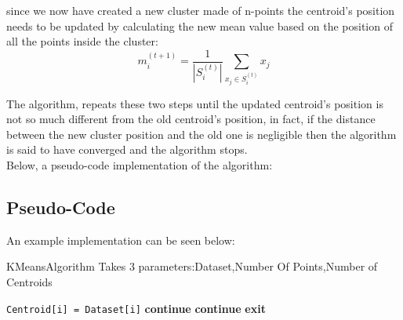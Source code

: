 \documentclass[10pt,twocolumn,letterpaper]{article}
\begin{document}
since we now have created a new cluster made of n-points the centroid's position needs to be updated by calculating the new 
mean value based on the position of all the points inside the cluster:\newline
\begin{equation}
\label{eq:first}
m^{(t+1)}_i = \frac{1}{\left|S^{(t)}_i\right|} \sum_{x_j \in S^{(t)}_i} x_j 
\end{equation}  

The algorithm, repeats these two steps until the updated centroid's position is not so much different from the old centroid's 
position, in fact, if the distance between the new cluster position and the old one is negligible then the algorithm is said to 
have converged and the algorithm stops.
\\
Below, a pseudo-code implementation of the algorithm:\\
\subsection{Pseudo-Code}
An example implementation can be seen below:
\begin{algorithm}
\caption{KMeansAlgorithm\newline
Takes 3 parameters:Dataset,Number Of Points,Number of Centroids}\label{euclid}
\begin{algorithmic}[1]
        \State \texttt{Centroid[i] = Dataset[i]}
    \EndFor
        			\EndIf
    			\EndFor
    		\EndFor
    					\State \textbf{continue}
        			\EndIf
    			\EndFor
    				\State \textbf{continue}
        		\EndIf
    		\EndFor
    			\State \textbf{exit}
        	\EndIf
    \EndWhile
\EndProcedure
\end{algorithmic}
\end{algorithm}
\newpage
\end{document}

